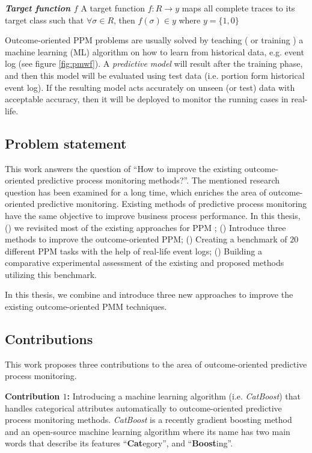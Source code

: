 \begin{definition}{\textit{\textbf{Target function $f$}}}
	A target function $f: R \to y$ maps all complete traces to its target class such that $\forall \sigma \in R$, then $f(\sigma) \in y$ where $y=\{1,0\}$
	
\end{definition}

Outcome-oriented PPM problems are usually solved by teaching ( or training ) a machine learning (ML) algorithm on how to learn from historical data, e.g. event log (see figure \ref{fig:pmwf}). A \textit{predictive model} will result after the training phase, and then this model will be evaluated using test data (i.e. portion form historical event log). If the resulting model acts accurately on unseen (or test) data with acceptable accuracy, then it will be deployed to monitor the running cases in real-life.


\newcommand{\quotes}[1]{``#1''}


\subsection{Problem statement}
This work answers the question of \quotes{How to improve the existing outcome-oriented predictive process monitoring methods?}.
The mentioned research question has been examined for a long time, which enriches the area of outcome-oriented predictive monitoring.  Existing methods of predictive process monitoring have the same objective to improve business process performance. In this thesis, () we revisited most of the existing approaches for PPM \cite{teinemaa2019outcome}; () Introduce three methods to improve the outcome-oriented PPM; () Creating a benchmark of $20$ different PPM tasks with the help of real-life event logs; () Building a comparative experimental assessment of the existing and proposed methods utilizing this benchmark. 

 In this thesis, we combine and introduce three new approaches to improve the existing outcome-oriented PMM techniques.


\subsection{Contributions}

This work proposes three contributions to the area of outcome-oriented predictive process monitoring. 

\textbf{Contribution $1$:}  Introducing a machine learning algorithm (i.e. \textit{CatBoost}) \cite{prokhorenkova2018catboost} that handles categorical attributes automatically to outcome-oriented predictive process monitoring methods. \textit{CatBoost} is a recently gradient boosting method and an open-source machine learning algorithm where its name has two main words that describe its features \quotes{\textbf{Cat}egory}, and \quotes{\textbf{Boost}ing}. \\

